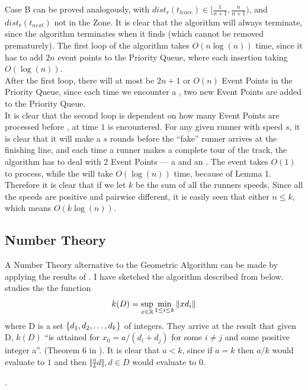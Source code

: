 {Case B can be proved analogously, with $dist_r(t_{leave}) \in [\frac{1}{n+1}, \frac{n}{n+1})$, and $dist_r(t_{next})$ not in the Zone.
}{
It is clear that the algorithm will always terminate, since the algorithm terminates when it finds \comFin (which cannot be removed prematurely).
}{
The first loop of the algorithm takes $O(n\log(n))$ time, since it has to add $2n$ event points to the Priority Queue, where each insertion taking $O(\log(n))$.\\

After the first loop, there will at most be $2n + 1$ or $O(n)$ Event Points in the Priority Queue, since each time we encounter a \comEnd, two new Event Points are added to the Priority Queue.\\ 

It is clear that the second loop is dependent on how many Event Points are processed before \comFin, at time $1$ is encountered. For any given runner with speed $s$, it is clear that it will make a $s$ rounds before the ``fake'' runner arrives at the finishing line, and each time  a runner makes a complete tour of the track, the algorithm has to deal with 2 Event Points --- a \comStart\; and an \comEnd. The \comStart\; event takes $O(1)$ to process, while the \comEnd will take $O(\log(n))$ time, because of Lemma 1. Therefore it is clear that if we let  $k$ be the sum of all the runners speeds. Since all the speeds are positive and pairwise different, it is easily seen that either $n \leq k$, which means $O(k\log(n))$.
}

\subsection{Number Theory}
\label{numtheory:algo}
A Number Theory alternative to the Geometric Algorithm can be made by applying the results of \cite{invis}. I have sketched the algorithm described from \cite{invis} below. \cite{invis} studies the the function 
$$
k(D) = \sup_{x \in \mathbb{R}}\min_{1 \leq i \leq k}\Vert x d_i \Vert
$$
where D is a set $\{d_1, d_2, \ldots, d_k\}$ of integers. They arrive at the result that given D, $k(D)$ ``is attained for $x_0 = a /(d_i + d_j)$ for some $i \neq j$ and some positive integer a''. (Theorem 6 in \cite{invis}). It is clear that $a < k$, since if $a = k$ then $a/k$ would evaluate to $1$ and then $\Vert \frac{a}{k} d\Vert, d \in D$ would evaluate to 0.

 .

